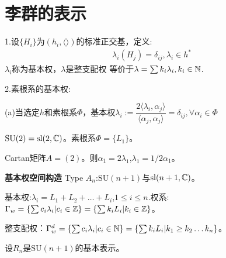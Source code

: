 \chapter{李群的表示}
\begin{definition}[基本权]
    1.设$\{H_i\}$为$(h_i,\langle \rangle)$的标准正交基，定义:
    \begin{align*}
        \lambda_i(H_j)=\delta_{ij},\lambda_i \in h^*
    \end{align*}
    $\lambda_i$称为基本权，$\lambda$是整支配权 等价于$\lambda=\sum k_i\lambda_i,k_i \in \mathbb{N}$.

    2.素根系的基本权:

    (a)当选定$h$和素根系$\Phi$，基本权$\lambda_i:=\dfrac{2\langle \lambda_i,\alpha_j\rangle}{\langle \alpha_j,\alpha_j\rangle}=\delta_{ij},\forall \alpha_i \in \Phi$
\end{definition}
\begin{example}
    $\mathrm{SU}(2)=\mathrm{sl}(2,\mathbb{C})$。素根系$\Phi=\{L_1\}$。

    Cartan矩阵$A=(2)$。则$\alpha_1=2\lambda_1$,$\lambda_1=1/2\alpha_1$。
\end{example}
\textbf{基本权空间构造}
Type $A_n$:$\mathrm{SU}(n+1)$与$\mathrm{sl}(n+1,\mathbb{C})$。

基本权:$\lambda_i=L_1+L_2+\dots+L_i$,$1 \leq i \leq n$.权系:$\Gamma_w=\{\sum c_i\lambda_i|c_i \in \mathbb{Z}\}=\{\sum k_i L_i|k_i \in \mathbb{Z}\}$。

整支配权：$\Gamma_w^d=\{\sum c_i \lambda_i|c_i \in \mathbb{N}\}=\{\sum k_i L_i|k_1 \geq k_2 \dots k_n\}$。

设$R_n$是$\mathrm{SU}(n+1)$的基本表示。
